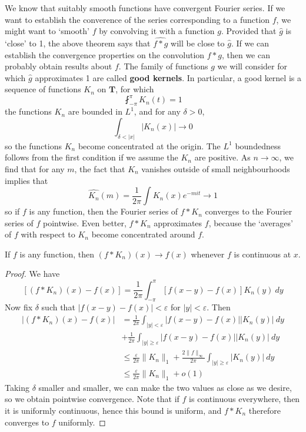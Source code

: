 We know that suitably smooth functions have convergent Fourier series. If we want to establish the converence of the series corresponding to a function $f$, we might want to `smooth' $f$ by convolving it with a function $g$. Provided that $\widehat{g}$ is `close' to 1, the above theorem says that $\widehat{f * g}$ will be close to $\widehat{g}$. If we can establish the convergence properties on the convolution $f * g$, then we can probably obtain results about $f$. The family of functions $g$ we will consider for which $\widehat{g}$ approximates 1 are called {\bf good kernels}. In particular, a good kernel is a sequence of functions $K_n$ on $\mathbf{T}$, for which
%
\[ \fint_{-\pi}^\pi K_n(t) = 1 \]
%
the functions $K_n$ are bounded in $L^1$, and for any $\delta > 0$,
%
\[ \int_{\delta < |x|} |K_n(x)| \to 0 \]
%
so the functions $K_n$ become concentrated at the origin. The $L^1$ boundedness follows from the first condition if we assume the $K_n$ are positive. As $n \to \infty$, we find that for any $m$, the fact that $K_n$ vanishes outside of small neighbourhoods implies that
%
\[ \widehat{K_n}(m) = \frac{1}{2\pi} \int K_n(x) e^{-mit} \to 1 \]
%
so if $f$ is any function, then the Fourier series of $f * K_n$ converges to the Fourier series of $f$ pointwise. Even better, $f * K_n$ approximates $f$, because the `averages' of $f$ with respect to $K_n$ become concentrated around $f$.

\begin{theorem}
    If $f$ is any function, then $(f * K_n)(x) \to f(x)$ whenever $f$ is continuous at $x$.
\end{theorem}
\begin{proof}
    We have
    \[ [(f * K_n)(x) - f(x)] = \frac{1}{2\pi} \int_{-\pi}^\pi [f(x - y) - f(x)] K_n(y)\ dy \]
    Now fix $\delta$ such that $|f(x - y) - f(x)| < \varepsilon$ for $|y| < \varepsilon$. Then
    \begin{align*}
        |(f * K_n)(x) - f(x)| &= \frac{1}{2\pi} \int_{|y| < \varepsilon} |f(x-y) - f(x)| |K_n(y)|\ dy\\
        &+ \frac{1}{2\pi} \int_{|y| \geq \varepsilon} |f(x-y) - f(x)| |K_n(y)|\ dy\\
        &\leq \frac{\varepsilon}{2\pi} \| K_n \|_1 + \frac{2 \| f \|_\infty}{2\pi} \int_{|y| \geq \varepsilon} |K_n(y)|\ dy\\
        &\leq \frac{\varepsilon}{2\pi} \| K_n \|_1 + o(1)
    \end{align*}
    Taking $\delta$ smaller and smaller, we can make the two values as close as we desire, so we obtain pointwise convergence. Note that if $f$ is continuous everywhere, then it is uniformly continuous, hence this bound is uniform, and $f * K_n$ therefore converges to $f$ uniformly.
\end{proof}

